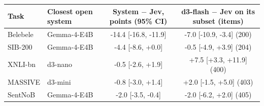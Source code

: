 \begin{tabular}{@{}llcc@{}}\toprule
Task & Closest open system & System $-$ Jev, points (95\% CI) & d3-flash $-$ Jev on its subset (items) \\\midrule
Belebele & Gemma-4-E4B & -14.4 [-16.8, -11.9] & -7.0 [-10.9, -3.4] (200) \\
SIB-200 & Gemma-4-E4B & -4.4 [-8.6, +0.0] & -0.5 [-4.9, +3.9] (204) \\
XNLI-bn & d3-nano & -0.5 [-2.6, +1.9] & +7.5 [+3.3, +11.9] (400) \\
MASSIVE & d3-mini & -0.8 [-3.0, +1.4] & +2.0 [-1.5, +5.0] (403) \\
SentNoB & Gemma-4-E4B & -2.0 [-3.5, -0.4] & -2.0 [-6.2, +2.0] (405) \\
\bottomrule\end{tabular}
